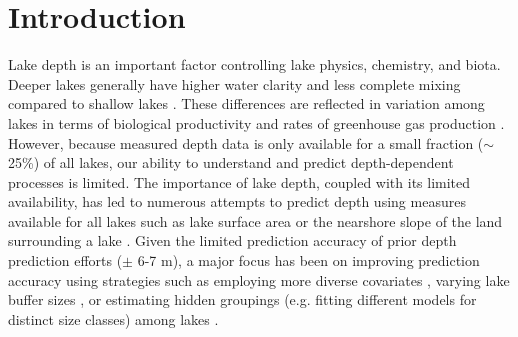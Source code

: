 \documentclass[draft]{agujournal2019}
\begin{document}

%
%
%
%


\section{Introduction}
\noindent
\noindent
Lake depth is an important factor controlling lake physics, chemistry, and biota. Deeper lakes generally have higher water clarity and less complete mixing compared to shallow lakes \cite{feeEffectsLakeSize1996, readSimulating2368Temperate2014}. These differences are reflected in variation among lakes in terms of biological productivity \cite{qinWaterDepthUnderpins2020} and rates of greenhouse gas production \cite{liSignificantContributionLake2020}. However, because measured depth data is only available for a small fraction ($\sim$25\%) of all lakes, our ability to understand and predict depth-dependent processes is limited. The importance of lake depth, coupled with its limited availability, has led to numerous attempts to predict depth using measures available for all lakes such as lake surface area or the nearshore slope of the land surrounding a lake \cite{heathcotePredictingBathymetricFeatures2015, oliver2016prediction, sobekPredictingDepthVolume2011}. Given the limited prediction accuracy of prior depth prediction efforts ($\pm$ 6-7 m), a major focus has been on  improving prediction accuracy using strategies such as employing more diverse covariates \cite{oliver2016prediction}, varying lake buffer sizes \cite{heathcotePredictingBathymetricFeatures2015}, or estimating hidden groupings (e.g. fitting different models for distinct size classes) among lakes \cite{sobekPredictingDepthVolume2011}.
\end{document}
